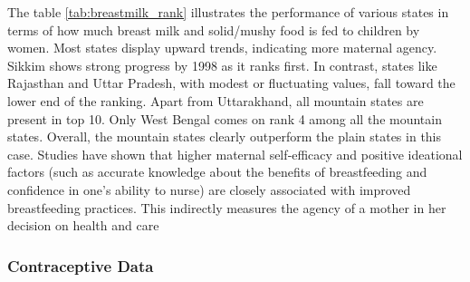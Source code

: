 The table \ref{tab:breastmilk_rank} illustrates the performance of various states in terms of how much breast milk and solid/mushy food is fed to children by women. Most states display  upward trends, indicating more maternal agency. Sikkim shows strong progress by 1998 as it ranks first. In contrast, states like Rajasthan and Uttar Pradesh, with modest or fluctuating values, fall toward the lower end of the ranking. Apart from Uttarakhand, all mountain states are present in top 10. Only West Bengal comes on rank 4 among all the mountain states. Overall, the mountain states clearly outperform the plain states in this case. Studies have shown that higher maternal self‐efficacy and positive ideational factors (such as accurate knowledge about the benefits of breastfeeding and confidence in one’s ability to nurse) are closely associated with improved breastfeeding practices. This indirectly measures the agency of a mother in her decision on health and care \citep{Hutchinson_2022}
\subsubsection{Contraceptive Data}

